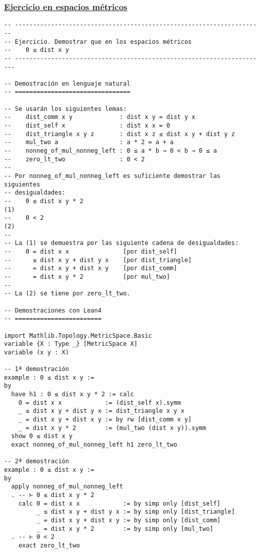 \subsubsection{\href{./src/Basicos/Ejercicio\_en\_espacios\_metricos.lean}{Ejercicio en espacios métricos}}
\label{sec:org8ee0875}
\begin{verbatim}
-- ---------------------------------------------------------------------
-- Ejercicio. Demostrar que en los espacios métricos
--    0 ≤ dist x y
-- ----------------------------------------------------------------------

-- Demostración en lenguaje natural
-- ================================

-- Se usarán los siguientes lemas:
--    dist_comm x y             : dist x y = dist y x
--    dist_self x               : dist x x = 0
--    dist_triangle x y z       : dist x z ≤ dist x y + dist y z
--    mul_two a                 : a * 2 = a + a
--    nonneg_of_mul_nonneg_left : 0 ≤ a * b → 0 < b → 0 ≤ a
--    zero_lt_two               : 0 < 2
--
-- Por nonneg_of_mul_nonneg_left es suficiente demostrar las siguientes
-- desigualdades:
--    0 ≤ dist x y * 2                                               (1)
--    0 < 2                                                          (2)
--
-- La (1) se demuestra por las siguiente cadena de desigualdades:
--    0 = dist x x               [por dist_self]
--      ≤ dist x y + dist y x    [por dist_triangle]
--      = dist x y + dist x y    [por dist_comm]
--      = dist x y * 2           [por mul_two]
--
-- La (2) se tiene por zero_lt_two.

-- Demostraciones con Lean4
-- ========================

import Mathlib.Topology.MetricSpace.Basic
variable {X : Type _} [MetricSpace X]
variable (x y : X)

-- 1ª demostración
example : 0 ≤ dist x y :=
by
  have h1 : 0 ≤ dist x y * 2 := calc
    0 = dist x x            := (dist_self x).symm
    _ ≤ dist x y + dist y x := dist_triangle x y x
    _ = dist x y + dist x y := by rw [dist_comm x y]
    _ = dist x y * 2        := (mul_two (dist x y)).symm
  show 0 ≤ dist x y
  exact nonneg_of_mul_nonneg_left h1 zero_lt_two

-- 2ª demostración
example : 0 ≤ dist x y :=
by
  apply nonneg_of_mul_nonneg_left
  . -- ⊢ 0 ≤ dist x y * 2
    calc 0 = dist x x            := by simp only [dist_self]
         _ ≤ dist x y + dist y x := by simp only [dist_triangle]
         _ = dist x y + dist x y := by simp only [dist_comm]
         _ = dist x y * 2        := by simp only [mul_two]
  . -- ⊢ 0 < 2
    exact zero_lt_two


\end{verbatim}
